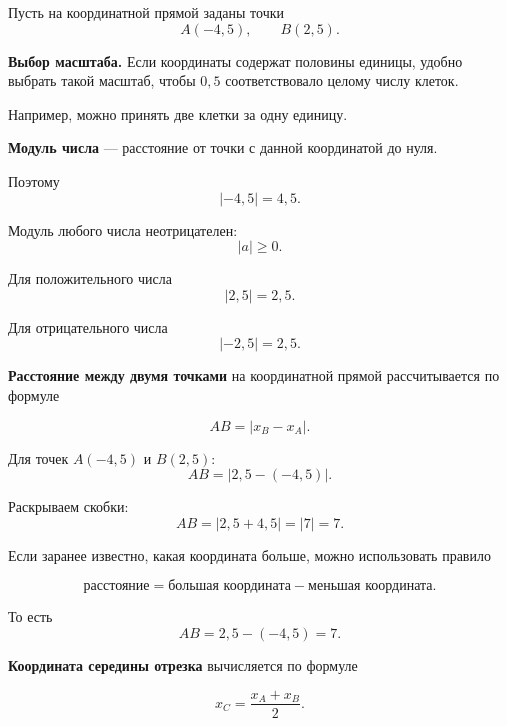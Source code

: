 \documentclass[a4paper,12pt]{article}
\newcommand{\skill}[1]{\textbf{\color{darkaccent}#1}}
\begin{document}
Пусть на координатной прямой заданы точки
\[
A(-4,5),
\qquad
B(2,5).
\]

\begin{center}
\end{center}

\skill{Выбор масштаба.}
Если координаты содержат половины единицы,
удобно выбрать такой масштаб, чтобы $0,5$
соответствовало целому числу клеток.

Например, можно принять две клетки за одну единицу.

\skill{Модуль числа}
--- расстояние от точки с данной координатой до нуля.

Поэтому
\[
|-4,5|=4,5.
\]

Модуль любого числа неотрицателен:
\[
|a|\ge 0.
\]

Для положительного числа
\[
|2,5|=2,5.
\]

Для отрицательного числа
\[
|-2,5|=2,5.
\]

\skill{Расстояние между двумя точками}
на координатной прямой рассчитывается по формуле

\[
AB=|x_B-x_A|.
\]

Для точек $A(-4,5)$ и $B(2,5)$:
\[
AB
=
|2,5-(-4,5)|.
\]

Раскрываем скобки:
\[
AB
=
|2,5+4,5|
=
|7|
=
7.
\]

Если заранее известно, какая координата больше,
можно использовать правило

\[
\text{расстояние}
=
\text{большая координата}
-
\text{меньшая координата}.
\]

То есть
\[
AB
=
2,5-(-4,5)
=
7.
\]

\skill{Координата середины отрезка}
вычисляется по формуле

\[
x_C
=
\frac{x_A+x_B}{2}.
\]
\end{document}
